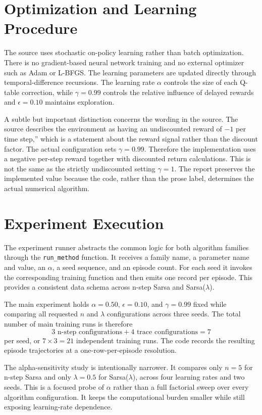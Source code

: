 \documentclass[11pt,a4paper]{article}
\begin{document}
\section{Optimization and Learning Procedure}
The source uses stochastic on-policy learning rather than batch optimization. There is no gradient-based neural network training and no external optimizer such as Adam or L-BFGS. The learning parameters are updated directly through temporal-difference recursions. The learning rate $\alpha$ controls the size of each Q-table correction, while $\gamma=0.99$ controls the relative influence of delayed rewards and $\epsilon=0.10$ maintains exploration.

A subtle but important distinction concerns the wording in the source. The source describes the environment as having an undiscounted reward of $-1$ per time step,'' which is a statement about the reward signal rather than the discount factor. The actual configuration sets $\gamma=0.99$. Therefore the implementation uses a negative per-step reward together with discounted return calculations. This is not the same as the strictly undiscounted setting $\gamma=1$. The report preserves the implemented value because the code, rather than the prose label, determines the actual numerical algorithm.

\section{Experiment Execution}
The experiment runner abstracts the common logic for both algorithm families through the \texttt{run\_method} function. It receives a family name, a parameter name and value, an $\alpha$, a seed sequence, and an episode count. For each seed it invokes the corresponding training function and then emits one record per episode. This provides a consistent data schema across n-step Sarsa and Sarsa($\lambda$).

The main experiment holds $\alpha=0.50$, $\epsilon=0.10$, and $\gamma=0.99$ fixed while comparing all requested $n$ and $\lambda$ configurations across three seeds. The total number of main training runs is therefore
\begin{equation}
3\text{ n-step configurations}+4\text{ trace configurations}=7
\end{equation}
per seed, or $7\times3=21$ independent training runs. The code records the resulting episode trajectories at a one-row-per-episode resolution.

The alpha-sensitivity study is intentionally narrower. It compares only $n=5$ for n-step Sarsa and only $\lambda=0.5$ for Sarsa($\lambda$), across four learning rates and two seeds. This is a focused probe of $\alpha$ rather than a full factorial sweep over every algorithm configuration. It keeps the computational burden smaller while still exposing learning-rate dependence.
\end{document}
